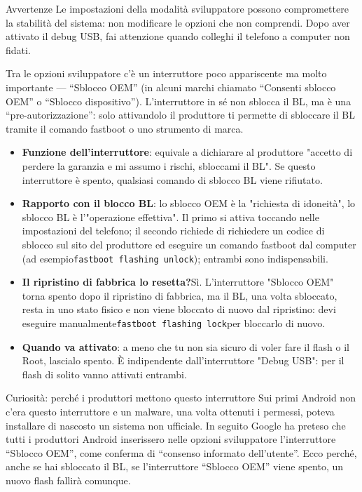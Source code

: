 \begin{tcbwarn}{Avvertenze}
Le impostazioni della modalità sviluppatore possono compromettere la stabilità del sistema: non modificare le opzioni che non comprendi. Dopo aver attivato il debug USB, fai attenzione quando colleghi il telefono a computer non fidati.

\end{tcbwarn}


Tra le opzioni sviluppatore c'è un interruttore poco appariscente ma molto importante — “Sblocco OEM” (in alcuni marchi chiamato “Consenti sblocco OEM” o “Sblocco dispositivo”). L'interruttore in sé non sblocca il BL, ma è una “pre-autorizzazione”: solo attivandolo il produttore ti permette di sbloccare il BL tramite il comando fastboot o uno strumento di marca.

\begin{itemize}
  \item \textbf{Funzione dell'interruttore}: equivale a dichiarare al produttore "accetto di perdere la garanzia e mi assumo i rischi, sbloccami il BL". Se questo interruttore è spento, qualsiasi comando di sblocco BL viene rifiutato.
  \item \textbf{Rapporto con il blocco BL}: lo sblocco OEM è la "richiesta di idoneità", lo sblocco BL è l'"operazione effettiva". Il primo si attiva toccando nelle impostazioni del telefono; il secondo richiede di richiedere un codice di sblocco sul sito del produttore ed eseguire un comando fastboot dal computer (ad esempio\texttt{fastboot flashing unlock}); entrambi sono indispensabili.
  \item \textbf{Il ripristino di fabbrica lo resetta?}Sì. L'interruttore "Sblocco OEM" torna spento dopo il ripristino di fabbrica, ma il BL, una volta sbloccato, resta in uno stato fisico e non viene bloccato di nuovo dal ripristino: devi eseguire manualmente\texttt{fastboot flashing lock}per bloccarlo di nuovo.
  \item \textbf{Quando va attivato}: a meno che tu non sia sicuro di voler fare il flash o il Root, lascialo spento. È indipendente dall'interruttore "Debug USB": per il flash di solito vanno attivati entrambi.
\end{itemize}

\begin{tcbinfo}{Curiosità: perché i produttori mettono questo interruttore}
Sui primi Android non c'era questo interruttore e un malware, una volta ottenuti i permessi, poteva installare di nascosto un sistema non ufficiale. In seguito Google ha preteso che tutti i produttori Android inserissero nelle opzioni sviluppatore l'interruttore “Sblocco OEM”, come conferma di “consenso informato dell'utente”. Ecco perché, anche se hai sbloccato il BL, se l'interruttore “Sblocco OEM” viene spento, un nuovo flash fallirà comunque.

\end{tcbinfo}

